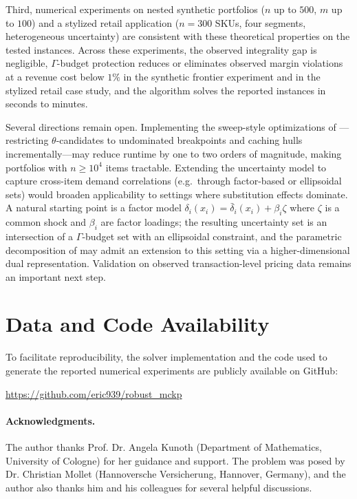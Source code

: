\documentclass[11pt, a4paper]{article}
\theoremstyle{plain}
\theoremstyle{definition}
\theoremstyle{remark}
\begin{document}
Third, numerical experiments on nested synthetic portfolios ($n$ up to $500$, $m$ up to
$100$) and a stylized retail application ($n=300$ SKUs, four segments, heterogeneous
uncertainty) are consistent with these theoretical properties on the tested instances.
Across these experiments, the observed integrality gap is negligible, $\Gamma$-budget
protection reduces or eliminates observed margin violations at a revenue cost below $1\%$ in the synthetic frontier experiment and in the stylized retail case study, and the algorithm solves the reported instances in seconds to minutes.

Several directions remain open.
Implementing the sweep-style optimizations of ---restricting
$\theta$-candidates to undominated breakpoints and caching hulls incrementally---may reduce runtime by one to two orders of magnitude, making portfolios with
$n\ge 10^4$ items tractable.
Extending the uncertainty model to capture cross-item demand correlations (e.g.\ through
factor-based or ellipsoidal sets) would broaden applicability to settings where
substitution effects dominate. A natural starting point is a factor model $\delta_i(x_i) = \bar\delta_i(x_i) + \beta_i \zeta$ where $\zeta$
is a common shock and $\beta_i$ are factor loadings; the resulting uncertainty set is an intersection of a $\Gamma$-budget set with an
ellipsoidal constraint, and the parametric decomposition of  may admit an extension to this setting via a higher-dimensional dual representation.
Validation on observed transaction-level pricing data remains an important next step.


\section*{Data and Code Availability}
To facilitate reproducibility, the solver implementation and the code used to generate the reported numerical experiments are publicly available on GitHub:
\begin{center}
\url{https://github.com/eric939/robust_mckp}
\end{center}

\paragraph{Acknowledgments.} The author thanks Prof. Dr. Angela Kunoth (Department of Mathematics, University of Cologne) for her guidance and support. The problem was posed by Dr. Christian Mollet (Hannoversche Versicherung, Hannover, Germany), and the author also thanks him and his colleagues for several helpful discussions.
\end{document}
